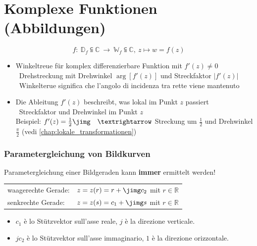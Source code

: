 \section{Komplexe Funktionen (Abbildungen)}

\vspace{-0.2cm}

$$ f: \: \mathbb{D}_f \subseteqq \mathbb{C}  \: \rightarrow \: \mathbb{W}_f \subseteqq  \mathbb{C}, \: z  \mapsto w = f(z) $$

\begin{itemize}[itemsep=0.2cm]
    \item Winkeltreue für komplex differenzierbare Funktion mit $f'(z) \neq 0$ \\
        \textrightarrow\ Drehstreckung mit Drehwinkel $\arg[f'(z)]$ und Streckfaktor $\vert f'(z) \vert$\\
        \textrightarrow\ Winkelterue significa che l'angolo di incidenza tra rette viene mantenuto
    \item Die Ableitung $f'(z)$ beschreibt, was lokal im Punkt $z$ passiert \\
        \textrightarrow\ Streckfaktor und Drehwinkel im Punkt $z$ \\
        Beispiel: $f'(z) = \frac{1}{2}\jimg \quad \textrightarrow$ Streckung um $\frac{1}{2}$ und Drehwinkel $\frac{\pi}{2}$ (vedi \ref{chap:lokale_transformationen})
\end{itemize}

\subsubsection{Parametergleichung von Bildkurven}

Parametergleichung einer Bildgeraden kann \textbf{immer} ermittelt werden!

\smallskip

\begin{tabular}{ll}
    waagerechte Gerade: & $z = z(r) = r + \jimg c_2$ \quad mit $r \in \mathbb{R}$ \\
    senkrechte Gerade:  & $z = z(s) = c_1 + \jimg s$ \quad mit $r \in \mathbb{R}$
\end{tabular}\vspace{1em}

\begin{itemize}
    \item $c_1$ è lo Stützvektor sull'asse reale, $j$ è la direzione verticale.
    \item $j c_2$ è lo Stützvektor sull'asse immaginario, $1$ è la direzione orizzontale.
\end{itemize}

